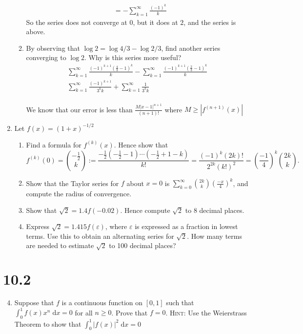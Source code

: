 \documentclass[letterpaper]{article}
\begin{document}
\begin{enumerate}
\begin{enumerate}
\begin{align*}
    &=-\sum\limits_{k=1}^\infty{\frac{(-1)^k}{k}}
  \end{align*}
  So the series does not converge at $0$, but it does at $2$, and the series is above.
  \item
  By observing that $\log 2=\log 4/3-\log 2/3$, find another series converging to $\log 2$. Why is this series more useful?
  \begin{align*}
    \sum\limits_{k=1}^\infty{\frac{(-1)^{k+1}(\frac{4}{3}-1)^k}{k}}
    -\sum\limits_{k=1}^\infty{\frac{(-1)^{k+1}(\frac{2}{3}-1)^k}{k}}\\
    \sum\limits_{k=1}^\infty{\frac{(-1)^{k+1}}{3^kk}}
    +\sum\limits_{k=1}^\infty{\frac{1}{3^kk}}\\
  \end{align*}

  We know that our error is less than $\frac{M|x-1|^{n+1}}{(n+1)!}$ where $M\ge |f^{(n+1)}(x)|$
  \end{enumerate}
\setcounter{enumi}{8}
\item
Let $f(x)=(1+x)^{-1/2}$
  \begin{enumerate}
  \item
  Find a formula for $f^{(k)}(x)$. Hence show that
  \[f^{(k)}(0)={-\frac{1}{2} \choose k}:=\frac{-\frac{1}{2}(-\frac{1}{2}-1)\cdots(-\frac{1}{2}+1-k)}{k!}=\frac{(-1)^k(2k)!}{2^{2k}(k!)^2}=\left(\frac{-1}{4}\right)^k{2k\choose k}.\]
  \item
  Show that the Taylor series for $f$ about $x=0$ is $\sum\limits_{k=0}^\infty{{2k\choose k}\left(\frac{-x}{4}\right)^k}$, and compute the radius of convergence.
  \item
  Show that $\sqrt{2}=1.4f(-0.02)$.
  Hence compute $\sqrt{2}$ to $8$ decimal places.
  \item
  Express $\sqrt{2}=1.415f(\varepsilon)$, where $\varepsilon$ is expressed as a fraction in lowest terms. Use this to obtain an alternating series for $\sqrt{2}$. How many terms are needed to estimate $\sqrt{2}$ to 100 decimal places?
  \end{enumerate}
\end{enumerate}
\section*{10.2}
\begin{enumerate}
\setcounter{enumi}{3}
\item
Suppose that $f$ is a continuous function on $[0,1]$ such that $\int_0^1{f(x)x^n\;\mathrm{d}x}=0$ for all $n\ge 0$. Prove that $f=0$. {\scshape Hint:} Use the Weierstrass Theorem to show that $\int_0^1{|f(x)|^2\;\mathrm{d}x}=0$
\end{enumerate}
\end{document}
